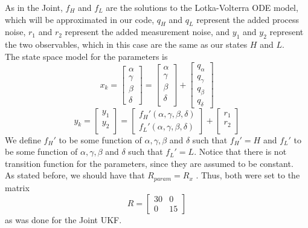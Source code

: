 \documentclass{article}
\begin{document}
As in the Joint, $f_H$ and $f_L$ are the solutions to the Lotka-Volterra ODE model, which will be approximated in our code, $q_H$ and $q_L$ represent the added process noise, $r_1$ and $r_2$ represent the added measurement noise, and $y_1$ and $y_2$ represent the two observables, which in this case are the same as our states $H$ and $L$.\\
The state space model for the parameters is
\begin{equation}
x_k = \begin{bmatrix}
\alpha\\
\gamma\\
\beta\\
\delta
\end{bmatrix} = \begin{bmatrix}
\alpha\\
\gamma\\
\beta\\
\delta\\
\end{bmatrix} + \begin{bmatrix}
q_{\alpha}\\
q_{\gamma}\\
q_{\beta}\\
q_{\delta}
\end{bmatrix}
\end{equation}
\begin{equation}
y_k = \begin{bmatrix}
y_1\\
y_2\\
\end{bmatrix} = 
\begin{bmatrix}
f_{H}'(\alpha, \gamma, \beta,\delta)\\
f_{L}'(\alpha, \gamma, \beta,\delta)
\end{bmatrix}+
\begin{bmatrix}
r_1\\
r_2\\
\end{bmatrix}
\end{equation}
We define $f_H'$ to be some function of $\alpha, \gamma, \beta$ and $\delta$ such that $f_H' = H$ and $f_L'$ to be  some function of $\alpha, \gamma, \beta$ and $\delta$ such that $f_L' = L$. Notice that there is not transition function for the parameters, since they are assumed to be constant. \\

As stated before, we should have that $R_{param} = R_x$ \cite{GoveHollingerDual}. Thus, both were set to the matrix
\begin{equation}
R = \begin{bmatrix}
30 & 0\\0 & 15\end{bmatrix} 
\end{equation}
as was done for the Joint UKF.\\
\end{document}
